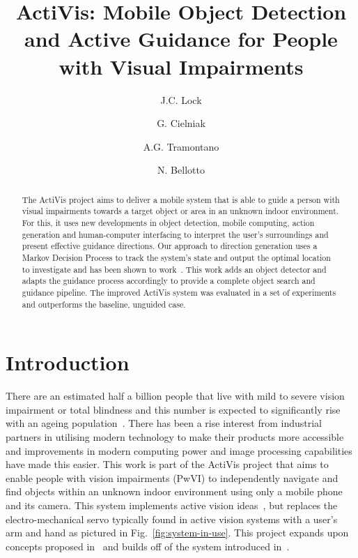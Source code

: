 \documentclass[runningheads]{llncs}
\begin{document}
\title{ActiVis: Mobile Object Detection and Active Guidance for People with Visual Impairments}

\author{J.C. Lock \and
  G. Cielniak \and
  A.G. Tramontano \and
  N. Bellotto
}

\maketitle

\begin{abstract}
  The ActiVis project aims to deliver a mobile system that is able to guide a person with visual impairments towards a target object or area in an unknown indoor environment. 
  For this, it uses new developments in object detection, mobile computing, action generation and human-computer interfacing to interpret the user's surroundings and present effective guidance directions.
  Our approach to direction generation uses a Markov Decision Process to track the system's state and output the optimal location to investigate and has been shown to work~\cite{lock2019active}.
  This work adds an object detector and adapts the guidance process accordingly to provide a complete object search and guidance pipeline.
  The improved ActiVis system was evaluated in a set of experiments and outperforms the baseline, unguided case.
\end{abstract}

\section{Introduction}

There are an estimated half a billion people that live with mild to severe vision impairment or total blindness and this number is expected to significantly rise with an ageing population~\cite{bourne2017magnitude}.
There has been a rise interest from industrial partners in utilising modern technology to make their products more accessible and improvements in modern computing power and image processing capabilities have made this easier.
This work is part of the ActiVis project that aims to enable people with vision impairments (PwVI) to independently navigate and find objects within an unknown indoor environment using only a mobile phone and its camera.
This system implements active vision ideas~\cite{bajcsy2017}, but replaces the electro-mechanical servo typically found in active vision systems with a user's arm and hand as pictured in Fig.~\ref{fig:system-in-use}.
This project expands upon concepts proposed in~\cite{bellotto2013,lock2017portable} and builds off of the system introduced in~\cite{lock2019active}.
\end{document}
